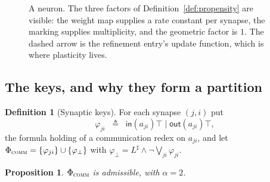 \documentclass[11pt,a4paper]{article}
\theoremstyle{plain}
\newtheorem{proposition}[theorem]{Proposition}
\theoremstyle{definition}
\newtheorem{definition}[theorem]{Definition}
\theoremstyle{remark}
\newcommand{\sepc}{\mathbin{\big|}}
\newcommand{\out}{\mathsf{out}}
\newcommand{\inn}{\mathsf{in}}
\newcommand{\wmap}{w}
\begin{document}
\begin{figure}[t]
\centering
{}
\caption{A neuron. The three factors of Definition~\ref{def:propensity} are visible: the weight map
supplies a rate constant per synapse, the marking supplies multiplicity, and the geometric factor is
$1$. The dashed arrow is the refinement entry's update function, which is where plasticity lives.}
\label{fig:neuron}
\end{figure}

\subsection{The keys, and why they form a partition}

\begin{definition}[Synaptic keys]
\label{def:synkeys}
For each synapse $(j,i)$ put
\[
\varphi_{ji} \;\;\triangleq\;\; \inn(a_{ji})\top \;\sepc\; \out(a_{ji})\top ,
\]
the formula holding of a communication redex on $a_{ji}$, and let
$\Phi_{\textsc{comm}} = \{\varphi_{ji}\} \cup \{\varphi_\bot\}$ with
$\varphi_\bot = L^\sharp \wedge \neg\bigvee_{ji}\varphi_{ji}$.
\end{definition}

\begin{proposition}
\label{prop:rnn-admissible}
$\Phi_{\textsc{comm}}$ is admissible, with $\alpha = 2$.
\end{proposition}
\end{document}
